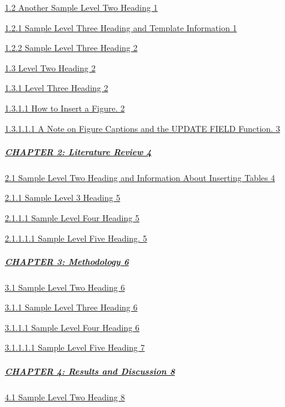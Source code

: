 \protect\hyperlink{another-sample-level-two-heading}{1.2 Another Sample
Level Two Heading 1}

\protect\hyperlink{_Toc114562013}{1.2.1 Sample Level Three Heading and
Template Information 1}

\protect\hyperlink{_Toc114562014}{1.2.2 Sample Level Three Heading 2}

\protect\hyperlink{level-two-heading}{1.3 Level Two Heading 2}

\protect\hyperlink{_Toc114562016}{1.3.1 Level Three Heading 2}

\protect\hyperlink{_Toc114562017}{1.3.1.1 How to Insert a Figure. 2}

\protect\hyperlink{_Toc114562018}{1.3.1.1.1 A Note on Figure Captions
and the UPDATE FIELD Function. 3}

\hypertarget{chapter-2-literature-review-4}{%
\subparagraph{\texorpdfstring{\protect\hyperlink{chapter-2-literature-review}{CHAPTER
2: Literature Review
4}}{CHAPTER 2: Literature Review 4}}\label{chapter-2-literature-review-4}}

\protect\hyperlink{_Toc114562020}{2.1 Sample Level Two Heading and
Information About Inserting Tables 4}

\protect\hyperlink{_Toc114562021}{2.1.1 Sample Level 3 Heading 5}

\protect\hyperlink{_Toc114562022}{2.1.1.1 Sample Level Four Heading 5}

\protect\hyperlink{_Toc114562023}{2.1.1.1.1 Sample Level Five Heading.
5}

\hypertarget{chapter-3-methodology-6}{%
\subparagraph{\texorpdfstring{\protect\hyperlink{chapter-3-methodology}{CHAPTER
3: Methodology
6}}{CHAPTER 3: Methodology 6}}\label{chapter-3-methodology-6}}

\protect\hyperlink{sample-level-two-heading}{3.1 Sample Level Two
Heading 6}

\protect\hyperlink{sample-level-three-heading}{3.1.1 Sample Level Three
Heading 6}

\protect\hyperlink{_Toc114562027}{3.1.1.1 Sample Level Four Heading 6}

\protect\hyperlink{_Toc114562028}{3.1.1.1.1 Sample Level Five Heading 7}

\hypertarget{chapter-4-results-and-discussion-8}{%
\subparagraph{\texorpdfstring{\protect\hyperlink{chapter-4-results-and-discussion}{CHAPTER
4: Results and Discussion
8}}{CHAPTER 4: Results and Discussion 8}}\label{chapter-4-results-and-discussion-8}}

\protect\hyperlink{_Toc114562030}{4.1 Sample Level Two Heading 8}


